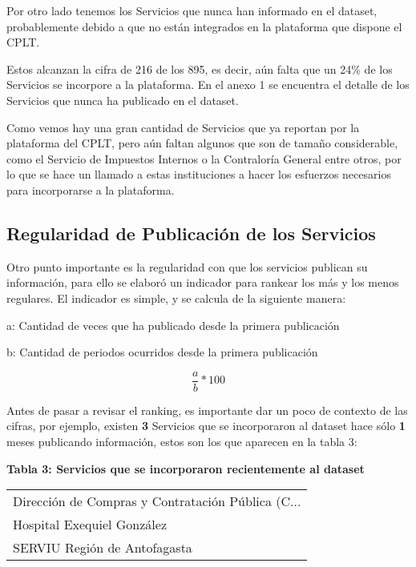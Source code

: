 \documentclass[11pt]{article}
\begin{document}
    
    Por otro lado tenemos los Servicios que nunca han informado en el
dataset, probablemente debido a que no están integrados en la plataforma
que dispone el CPLT.

Estos alcanzan la cifra de 216 de los 895, es decir, aún falta que un
24\% de los Servicios se incorpore a la plataforma. En el anexo 1 se
encuentra el detalle de los Servicios que nunca ha publicado en el
dataset.

    Como vemos hay una gran cantidad de Servicios que ya reportan por la
plataforma del CPLT, pero aún faltan algunos que son de tamaño
considerable, como el Servicio de Impuestos Internos o la Contraloría
General entre otros, por lo que se hace un llamado a estas instituciones
a hacer los esfuerzos necesarios para incorporarse a la plataforma.

    \hypertarget{regularidad-de-publicaciuxf3n-de-los-servicios}{%
\subsection{Regularidad de Publicación de los
Servicios}\label{regularidad-de-publicaciuxf3n-de-los-servicios}}

Otro punto importante es la regularidad con que los servicios publican
su información, para ello se elaboró un indicador para rankear los más y
los menos regulares. El indicador es simple, y se calcula de la
siguiente manera:

a: Cantidad de veces que ha publicado desde la primera publicación

b: Cantidad de periodos ocurridos desde la primera publicación

\[\frac{a}{b}*100\]

    Antes de pasar a revisar el ranking, es importante dar un poco de
contexto de las cifras, por ejemplo, existen \textbf{3} Servicios que se
incorporaron al dataset hace sólo \textbf{1} meses publicando
información, estos son los que aparecen en la tabla 3:

\textbf{Tabla 3: Servicios que se incorporaron recientemente al dataset}

    \begin{tabular}{l}
\toprule
 Dirección de Compras y Contratación Pública (C... \\
                        Hospital Exequiel González \\
                      SERVIU Región de Antofagasta \\
\bottomrule
\end{tabular}
\end{document}
